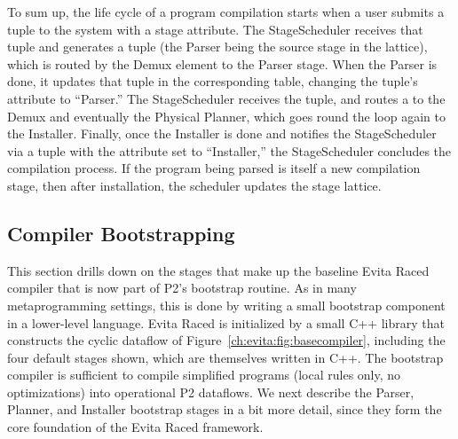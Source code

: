 To sum up, the life cycle of a program compilation starts when a user submits a
 tuple to the system with a  stage attribute.  The
StageScheduler receives that  tuple and generates a
 tuple (the Parser being the source stage in the
lattice), which is routed by the Demux element to the Parser stage.  When the
Parser is done, it updates that  tuple in the corresponding table,
changing the tuple's attribute to ``Parser.'' The StageScheduler receives the
 tuple, and routes a  to the Demux and
eventually the Physical Planner, which goes round the loop again to the
Installer.  Finally, once the Installer is done and notifies the StageScheduler
via a  tuple with the  attribute set to ``Installer,''
the StageScheduler concludes the compilation process.  If the \OVERLOG program
being parsed is itself a new compilation stage, then after installation, the
scheduler updates the stage lattice.


\subsection{Compiler Bootstrapping}
\label{ch:evita:sec:bootstrap}

This section drills down on the stages that make up the baseline Evita Raced
compiler that is now part of P2's bootstrap routine.  As in many
metaprogramming settings, this is done by writing a small bootstrap component
in a lower-level language.  Evita Raced is initialized by a small C++ library
that constructs the cyclic dataflow of Figure~\ref{ch:evita:fig:basecompiler},
including the four default stages shown, which are themselves written in C++.
The bootstrap compiler is sufficient to compile simplified \OVERLOG programs
(local rules only, no optimizations) into operational P2 dataflows.  We next
describe the Parser, Planner, and Installer bootstrap stages in
a bit more detail, since they form the core foundation of the Evita Raced
framework.



